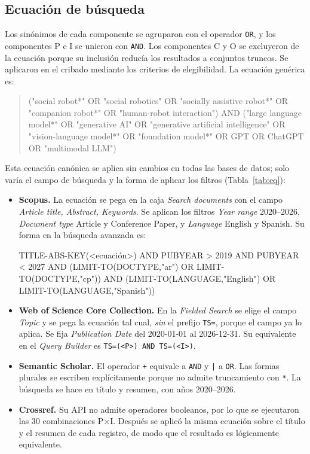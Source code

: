 \documentclass[runningheads]{llncs}
\begin{document}
\subsection{Ecuación de búsqueda}
Los sinónimos de cada componente se agruparon con el operador \texttt{OR}, y los componentes P e I se unieron con \texttt{AND}. Los componentes C y O se excluyeron de la ecuación porque su inclusión reducía los resultados a conjuntos truncos. Se aplicaron en el cribado mediante los criterios de elegibilidad. La ecuación genérica es:

\begin{quote}\small\ttfamily\raggedright
("social robot*" OR "social robotics" OR "socially assistive robot*" OR "companion robot*" OR "human-robot interaction") AND ("large language model*" OR "generative AI" OR "generative artificial intelligence" OR "vision-language model*" OR "foundation model*" OR GPT OR ChatGPT OR "multimodal LLM")
\end{quote}

Esta ecuación canónica se aplica sin cambios en todas las bases de datos; solo varía el campo de búsqueda y la forma de aplicar los filtros (Tabla~\ref{tab:eq}):

\begin{itemize}
\item \textbf{Scopus.} La ecuación se pega en la caja \textit{Search documents} con el campo \textit{Article title, Abstract, Keywords}. Se aplican los filtros \textit{Year range} 2020--2026, \textit{Document type} Article y Conference Paper, y \textit{Language} English y Spanish. Su forma en la búsqueda avanzada es:\\
{\ttfamily\raggedright TITLE-ABS-KEY(<ecuación>) AND PUBYEAR > 2019 AND PUBYEAR < 2027 AND (LIMIT-TO(DOCTYPE,"ar") OR LIMIT-TO(DOCTYPE,"cp")) AND (LIMIT-TO(LANGUAGE,"English") OR LIMIT-TO(LANGUAGE,"Spanish"))\par}
\item \textbf{Web of Science Core Collection.} En la \textit{Fielded Search} se elige el campo \textit{Topic} y se pega la ecuación tal cual, \emph{sin} el prefijo \texttt{TS=}, porque el campo ya lo aplica. Se fija \textit{Publication Date} del 2020-01-01 al 2026-12-31. Su equivalente en el \textit{Query Builder} es \texttt{TS=(<P>) AND TS=(<I>)}.
\item \textbf{Semantic Scholar.} El operador \texttt{+} equivale a \texttt{AND} y \texttt{|} a \texttt{OR}. Las formas plurales se escriben explícitamente porque no admite truncamiento con \texttt{*}. La búsqueda se hace en título y resumen, con años 2020--2026.
\item \textbf{Crossref.} Su API no admite operadores booleanos, por lo que se ejecutaron las 30 combinaciones P$\times$I. Después se aplicó la misma ecuación sobre el título y el resumen de cada registro, de modo que el resultado es lógicamente equivalente.
\end{itemize}
\end{document}
